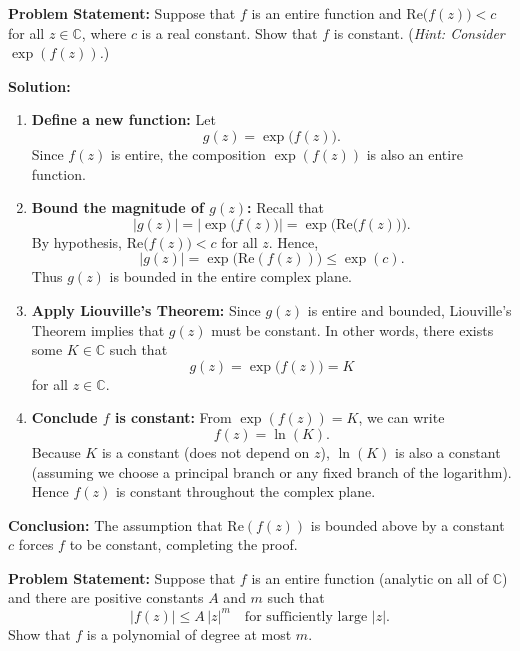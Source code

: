 \documentclass[12pt]{article}
\title{}
\author{Jerich Lee}
\date{\today}
\theoremstyle{definition} %
\theoremstyle{plain} %
\begin{document}
\maketitle

\textbf{Problem Statement:} Suppose that $f$ is an entire function and $\mathrm{Re}\bigl(f(z)\bigr) < c$ for all $z \in \mathbb{C}$, where $c$ is a real constant. Show that $f$ is constant. (\textit{Hint: Consider $\exp(f(z))$.})

\bigskip

\textbf{Solution:}

\begin{enumerate}
\item \textbf{Define a new function:} Let 
\[
g(z) = \exp\bigl(f(z)\bigr).
\]
Since $f(z)$ is entire, the composition $\exp(f(z))$ is also an entire function.

\item \textbf{Bound the magnitude of $g(z)$:} Recall that 
\[
\left| g(z) \right| = \left| \exp\bigl(f(z)\bigr) \right|
= \exp\bigl(\mathrm{Re}\bigl(f(z)\bigr)\bigr).
\]
By hypothesis, $\mathrm{Re}\bigl(f(z)\bigr) < c$ for all $z$. Hence,
\[
|g(z)| = \exp\bigl(\mathrm{Re}(f(z))\bigr) \le \exp(c).
\]
Thus $g(z)$ is bounded in the entire complex plane.

\item \textbf{Apply Liouville's Theorem:} Since $g(z)$ is entire and bounded, Liouville's Theorem implies that $g(z)$ must be constant. In other words, there exists some $K \in \mathbb{C}$ such that
\[
g(z) = \exp\bigl(f(z)\bigr) = K
\]
for all $z \in \mathbb{C}$.

\item \textbf{Conclude $f$ is constant:} From $\exp(f(z)) = K$, we can write
\[
f(z) = \ln(K).
\]
Because $K$ is a constant (does not depend on $z$), $\ln(K)$ is also a constant (assuming we choose a principal branch or any fixed branch of the logarithm). Hence $f(z)$ is constant throughout the complex plane.

\end{enumerate}

\textbf{Conclusion:} The assumption that $\mathrm{Re}(f(z))$ is bounded above by a constant $c$ forces $f$ to be constant, completing the proof.

\textbf{Problem Statement:}  
Suppose that $f$ is an entire function (analytic on all of $\mathbb{C}$) and there are positive constants $A$ and $m$ such that
\[
|f(z)| \le A\,|z|^m 
\quad
\text{for sufficiently large } |z|.
\]
Show that $f$ is a polynomial of degree at most $m$. 
\end{document}
